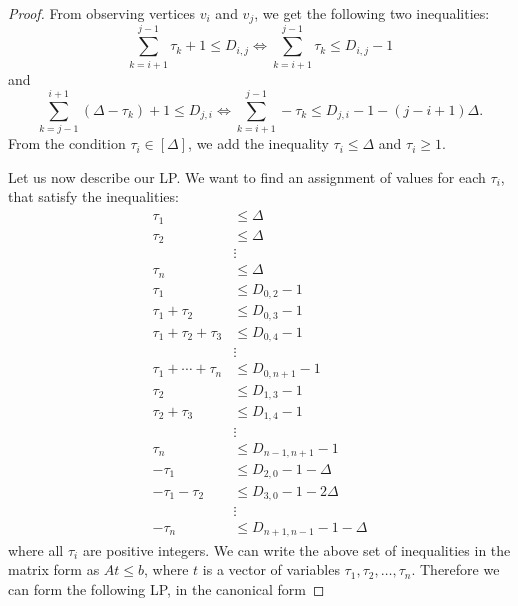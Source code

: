 \documentclass[a4paper,UKenglish,cleveref, autoref, thm-restate]{lipics-v2021}
\begin{document}
\begin{proof}
From observing vertices $v_i$ and $v_j$, we get the following two inequalities:
\begin{equation}
\sum_{k = i+1}^{j-1} \tau_k + 1 \leq D_{i,j}
\Leftrightarrow
\sum_{k = i+1}^{j-1} \tau_k \leq D_{i,j} - 1
\end{equation}
and
\begin{equation}
\sum_{k = j-1}^{i+1} (\Delta - \tau_k) + 1 \leq D_{j,i}
\Leftrightarrow
\sum_{k = i+1}^{j-1} - \tau_k \leq  D_{j,i} - 1 -(j-i+1)\Delta .
\end{equation}
From the condition $\tau_i \in [\Delta]$, we add the inequality $\tau_i \leq \Delta$ and $\tau_i \geq 1$.

Let us now describe our LP.
We want to find an assignment of values for each $\tau_i$, that satisfy the inequalities:
\begin{equation} \label{eq:paths-inequalities-A}
\begin{aligned}
\tau_1 & \leq \Delta \\
\tau_2 & \leq \Delta \\
& \vdots \\
\tau_n &\leq \Delta \\
\tau_1 &\leq D_{0,2} -1 \\
\tau_1 + \tau_2 &\leq D_{0,3} -1 \\
\tau_1 + \tau_2 + \tau_3 &\leq D_{0,4} -1 \\
& \vdots \\
\tau_1 + \cdots + \tau_n &\leq D_{0,n+1} -1 \\
\tau_2 & \leq D_{1,3} -1 \\
\tau_2 + \tau_3 &\leq D_{1,4} - 1\\
& \vdots \\
\tau_n &\leq D_{n-1,n+1} - 1 \\
- \tau_1 &\leq D_{2,0} -1 - \Delta \\
- \tau_1 - \tau_2 &\leq D_{3,0} -1 -2 \Delta \\
& \vdots \\
- \tau_n &\leq D_{n+1,n-1} - 1 - \Delta
\end{aligned}
\end{equation}
where all $\tau_i$ are positive integers.
We can write the above set of inequalities in the matrix form as $A t \leq b$, where $t$ is a vector of variables $\tau_1,\tau_2,\dots, \tau_n$.
Therefore we can form the following LP, in the canonical form

\end{proof}
\end{document}
